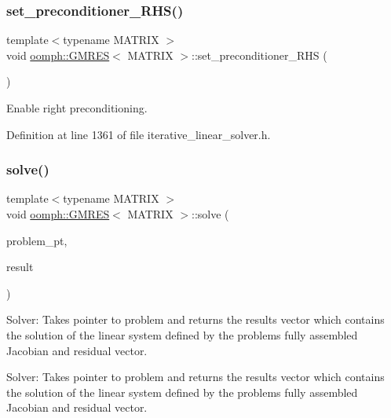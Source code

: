 \subsubsection{\texorpdfstring{set\+\_\+preconditioner\+\_\+\+R\+H\+S()}{set\_preconditioner\_RHS()}}
{\footnotesize\ttfamily template$<$typename M\+A\+T\+R\+IX $>$ \\
void \hyperlink{classoomph_1_1GMRES}{oomph\+::\+G\+M\+R\+ES}$<$ M\+A\+T\+R\+IX $>$\+::set\+\_\+preconditioner\+\_\+\+R\+HS (\begin{DoxyParamCaption}{ }\end{DoxyParamCaption})\hspace{0.3cm}{\ttfamily [inline]}}



Enable right preconditioning. 



Definition at line 1361 of file iterative\+\_\+linear\+\_\+solver.\+h.

\mbox{\label{classoomph_1_1GMRES_ade0f569ecda6b63d3e77dfe07a19cb13}} 
\subsubsection{\texorpdfstring{solve()}{solve()}\hspace{0.1cm}{\footnotesize\ttfamily [1/3]}}
{\footnotesize\ttfamily template$<$typename M\+A\+T\+R\+IX $>$ \\
void \hyperlink{classoomph_1_1GMRES}{oomph\+::\+G\+M\+R\+ES}$<$ M\+A\+T\+R\+IX $>$\+::solve (\begin{DoxyParamCaption}\item[{\hyperlink{classoomph_1_1Problem}{Problem} $\ast$const \&}]{problem\+\_\+pt,  }\item[{\hyperlink{classoomph_1_1DoubleVector}{Double\+Vector} \&}]{result }\end{DoxyParamCaption})\hspace{0.3cm}{\ttfamily [virtual]}}



Solver\+: Takes pointer to problem and returns the results vector which contains the solution of the linear system defined by the problem\textquotesingle{}s fully assembled Jacobian and residual vector. 

Solver\+: Takes pointer to problem and returns the results vector which contains the solution of the linear system defined by the problem\textquotesingle{}s fully assembled Jacobian and residual vector. 

